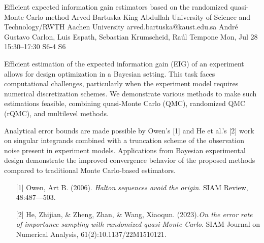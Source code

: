 \begin{talk}
  {Efficient expected information gain estimators based on the randomized quasi-Monte Carlo method}%
  {Arved Bartuska}%
  {King Abdullah University of Science and Technology/RWTH Aachen University}%
  {arved.bartuska@kaust.edu.sa}%
  {Andr\'{e} Gustavo Carlon, Luis Espath, Sebastian Krumscheid, Ra\'{u}l Tempone}%
  {}%
  {Mon, Jul 28 15:30–17:30}%
  {S6-4}%
  {S6}%
  
				
			
Efficient estimation of the expected information gain (EIG) of an experiment allows for design optimization in a Bayesian setting. This task faces computational challenges, particularly when the experiment model requires numerical discretization schemes. We demonstrate various methods to make such estimations feasible, combining quasi-Monte Carlo (QMC), randomized QMC (rQMC), and multilevel methods.

Analytical error bounds are made possible by Owen's [1] and He et al.'s [2] work on singular integrands combined with a truncation scheme of the observation noise present in experiment models. Applications from Bayesian experimental design demonstrate the improved convergence behavior of the proposed methods compared to traditional Monte Carlo-based estimators.

\medskip

\begin{enumerate}
	\item[{[1]}] Owen, Art B. (2006). {\it Halton sequences avoid the origin}. SIAM Review, 48:487---503.
	\item[{[2]}] He, Zhijian, \& Zheng, Zhan, \& Wang, Xiaoqun. (2023).{\it On the error rate of importance sampling with randomized quasi-Monte Carlo}. SIAM Journal
on Numerical Analysis,  61(2):10.1137/22M1510121.
\end{enumerate}

\end{talk}

